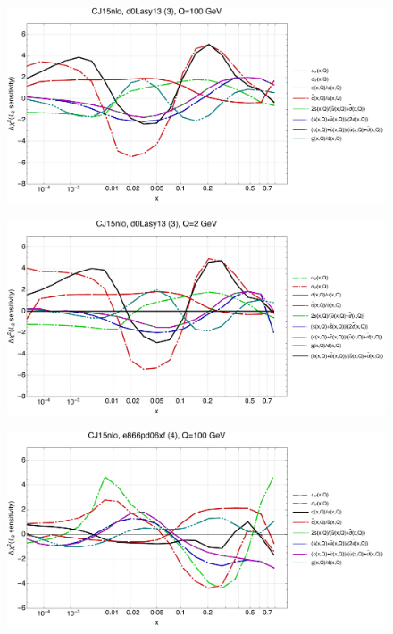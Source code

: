 \documentclass[10pt,aps,prd,floatfix,titlepage]{revtex4}
\begin{document}
\clearpage
\begin{figure}
\includegraphics[width=\textwidth,height=0.44\textheight,keepaspectratio]{2/3_CJ15nlo_q100_Sf_2.pdf}
\caption{}
\end{figure}
\begin{figure}
\includegraphics[width=\textwidth,height=0.44\textheight,keepaspectratio]{2/3_CJ15nlo_q2_Sf_2.pdf}
\caption{}
\end{figure}
\clearpage
\begin{figure}
\includegraphics[width=\textwidth,height=0.44\textheight,keepaspectratio]{2/4_CJ15nlo_q100_Sf_2.pdf}
\caption{}
\end{figure}
\end{document}
